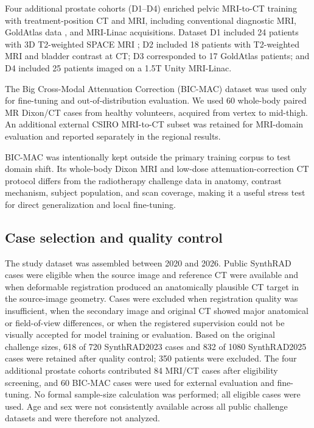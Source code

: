 \documentclass{article}
\begin{document}
Four additional prostate cohorts (D1--D4) enriched pelvic MRI-to-CT training with treatment-position CT and MRI, including conventional diagnostic MRI, GoldAtlas data \cite{nyholm2018mr}, and MRI-Linac acquisitions. Dataset D1 included 24 patients with 3D T2-weighted SPACE MRI \cite{dowling2015automatic}; D2 included 18 patients with T2-weighted MRI and bladder contrast at CT; D3 corresponded to 17 GoldAtlas patients; and D4 included 25 patients imaged on a 1.5T Unity MRI-Linac.

The Big Cross-Modal Attenuation Correction (BIC-MAC) dataset \cite{hinge2026bicmac} was used only for fine-tuning and out-of-distribution evaluation. We used 60 whole-body paired MR Dixon/CT cases from healthy volunteers, acquired from vertex to mid-thigh. An additional external CSIRO MRI-to-CT subset was retained for MRI-domain evaluation and reported separately in the regional results.

BIC-MAC was intentionally kept outside the primary training corpus to test domain shift. Its whole-body Dixon MRI and low-dose attenuation-correction CT protocol differs from the radiotherapy challenge data in anatomy, contrast mechanism, subject population, and scan coverage, making it a useful stress test for direct generalization and local fine-tuning.

\subsection{Case selection and quality control}

The study dataset was assembled between 2020 and 2026. Public SynthRAD cases were eligible when the source image and reference CT were available and when deformable registration produced an anatomically plausible CT target in the source-image geometry. Cases were excluded when registration quality was insufficient, when the secondary image and original CT showed major anatomical or field-of-view differences, or when the registered supervision could not be visually accepted for model training or evaluation. Based on the original challenge sizes, 618 of 720 SynthRAD2023 cases and 832 of 1080 SynthRAD2025 cases were retained after quality control; 350 patients were excluded. The four additional prostate cohorts contributed 84 MRI/CT cases after eligibility screening, and 60 BIC-MAC cases were used for external evaluation and fine-tuning. No formal sample-size calculation was performed; all eligible cases were used. Age and sex were not consistently available across all public challenge datasets and were therefore not analyzed.
\end{document}
